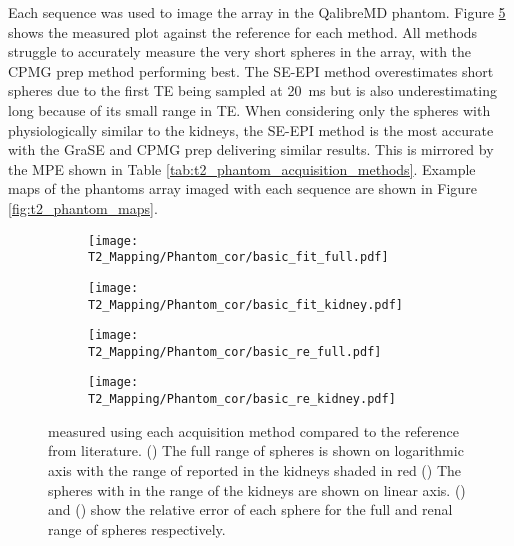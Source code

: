 Each sequence was used to image the \ttwo array in the QalibreMD phantom. Figure \ref{fig:t2_phantom_cor} shows the measured \ttwo plot against the reference \ttwo for each method. All methods struggle to accurately measure the very short \ttwo spheres in the array, with the \ac{CPMG} \ttwo prep method performing best. The \ac{SE}-\ac{EPI} method overestimates short \ttwo spheres due to the first \ac{TE} being sampled at 20~ms but is also underestimating long \ttwo because of its small range in \ac{TE}. When considering only the spheres with physiologically similar \ttwo to the kidneys, the \ac{SE}-\ac{EPI} method is the most accurate with the \ac{GraSE} and \ac{CPMG} \ttwo prep delivering similar results. This is mirrored by the \ac{MPE} shown in Table \ref{tab:t2_phantom_acquisition_methods}. Example \ttwo maps of the phantoms \ttwo array imaged with each sequence are shown in Figure \ref{fig:t2_phantom_maps}.

\begin{figure}[H]
	\centering
	\begin{subfigure}[c]{0.47\textwidth}
		\centering
		\texttt{[image: T2\_Mapping/Phantom\_cor/basic\_fit\_full.pdf]}
		\caption{}
		\label{fig:t2_phantom_cor_full}
	\end{subfigure}
	\hfill
	\begin{subfigure}[c]{0.47\textwidth}
		\centering
		\texttt{[image: T2\_Mapping/Phantom\_cor/basic\_fit\_kidney.pdf]}
		\caption{}
		\label{fig:t2_phantom_cor_kidney}
	\end{subfigure}
	\vfill
		\begin{subfigure}[c]{0.47\textwidth}
		\centering
		\texttt{[image: T2\_Mapping/Phantom\_cor/basic\_re\_full.pdf]}
		\caption{}
		\label{fig:t2_phantom_re_full}
	\end{subfigure}
	\hfill
	\begin{subfigure}[c]{0.47\textwidth}
		\centering
		\texttt{[image: T2\_Mapping/Phantom\_cor/basic\_re\_kidney.pdf]}
		\caption{}
		\label{fig:t2_phantom_re_kidney}
	\end{subfigure}
	\caption{\ttwo measured using each acquisition method compared to the reference \ttwo from literature. () The full range of \ttwo spheres is shown on logarithmic axis with the range of \ttwo reported in the kidneys shaded in red () The spheres with \ttwo in the range of the kidneys are shown on linear axis. () and () show the relative error of each sphere for the full and renal range of spheres respectively.}
	\label{fig:t2_phantom_cor}
\end{figure}

